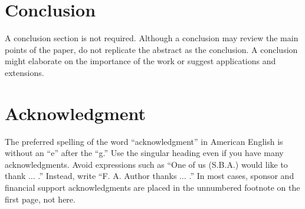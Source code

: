 \documentclass{ieeeaccess}
\begin{document}
\section{Conclusion}
A conclusion section is not required. Although a conclusion may review the 
main points of the paper, do not replicate the abstract as the conclusion. A 
conclusion might elaborate on the importance of the work or suggest 
applications and extensions. 

\section*{Acknowledgment}

The preferred spelling of the word ``acknowledgment'' in American English is 
without an ``e'' after the ``g.'' Use the singular heading even if you have 
many acknowledgments. Avoid expressions such as ``One of us (S.B.A.) would 
like to thank $\ldots$ .'' Instead, write ``F. A. Author thanks $\ldots$ .'' In most 
cases, sponsor and financial support acknowledgments are placed in the 
unnumbered footnote on the first page, not here.
\end{document}
